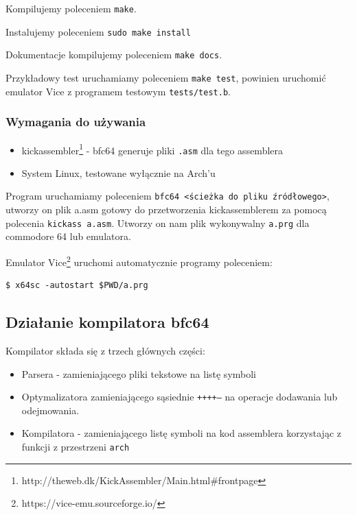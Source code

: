 \documentclass[a4paper,12pt]{article}
\begin{document}
    Kompilujemy poleceniem \texttt{make}.

    \vspace{5mm}

    Instalujemy poleceniem \texttt{sudo make install}

    \vspace{5mm}

    Dokumentacje kompilujemy poleceniem \texttt{make docs}.

    \vspace{5mm}

    Przykładowy test uruchamiamy poleceniem \texttt{make test}, powinien uruchomić emulator Vice z programem testowym \texttt{tests/test.b}.

    \subsubsection*{Wymagania do używania}\label{usecase}

    \begin{itemize}
        \item kickassembler\footnote{http://theweb.dk/KickAssembler/Main.html\#frontpage} - bfc64 generuje pliki \texttt{.asm} dla tego assemblera
        \item System Linux, testowane wyłącznie na Arch'u
    \end{itemize}

    Program uruchamiamy poleceniem \texttt{bfc64 <ścieżka do pliku źródłowego>}, utworzy on plik a.asm gotowy do przetworzenia kickassemblerem za pomocą polecenia \texttt{kickass a.asm}. Utworzy on nam plik wykonywalny \texttt{a.prg} dla commodore 64 lub emulatora.

    Emulator Vice\footnote{https://vice-emu.sourceforge.io/} uruchomi automatycznie programy poleceniem:
    \begin{lstlisting}[frame=single,basicstyle=\ttfamily]
$ x64sc -autostart $PWD/a.prg
    \end{lstlisting}

    \subsection{Działanie kompilatora bfc64}

    Kompilator składa się z trzech głównych części:
    \begin{itemize}
        \item Parsera - zamieniającego pliki tekstowe na listę symboli
        \item Optymalizatora zamieniającego sąsiednie \texttt{++++--} na operacje dodawania lub odejmowania.
        \item Kompilatora - zamieniającego listę symboli na kod assemblera korzystając z funkcji z przestrzeni \texttt{arch}
    \end{itemize}
\end{document}
